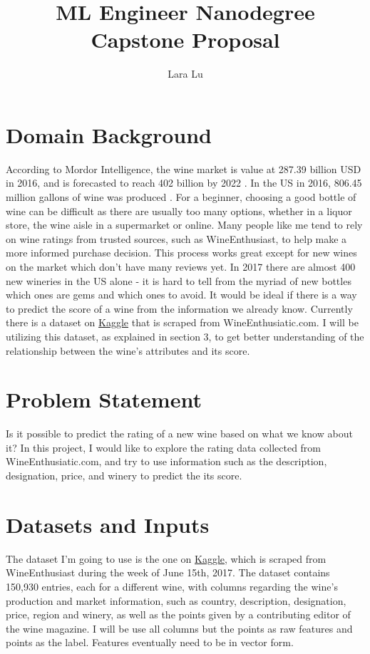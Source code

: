 \documentclass{article}
\begin{document}
\title{ML Engineer Nanodegree Capstone Proposal}
\author{Lara Lu}
\maketitle
\section{Domain Background}
According to Mordor Intelligence, the wine market is value at 287.39 billion USD in 2016, and is forecasted to reach 402 billion by 2022 \cite{mordorintelligence}. In the US in 2016, 806.45 million gallons of wine was produced \cite{statistica}.  For a beginner, choosing a good bottle of wine can be difficult as there are usually too many options, whether in a liquor store, the wine aisle in a supermarket or online. Many people like me tend to rely on wine ratings from trusted sources, such as WineEnthusiast, to help make a more informed purchase decision. This process works great except for new wines on the market which don't have many reviews yet. In 2017 there are almost 400 new wineries in the US alone\cite{winebusiness} - it is hard to tell from the myriad of new bottles which ones are gems and which ones to avoid. It would be ideal if there is a way to predict the score of a wine from the information we already know. Currently there is a dataset on \href{https://www.kaggle.com/zynicide/wine-reviews/}{Kaggle} that is scraped from WineEnthusiatic.com. I will be utilizing this dataset, as explained in section 3, to get better understanding of the relationship between the wine's attributes and its score.

\section{Problem Statement}
Is it possible to predict the rating of a new wine based on what we know about it? In this project, I would like to explore the rating data collected from WineEnthusiatic.com, and try to use information such as the description, designation, price, and winery to predict the its score.

\section{Datasets and Inputs}
The dataset I'm going to use is the one on \href{https://www.kaggle.com/zynicide/wine-reviews/data}{Kaggle}, which is scraped from WineEnthusiast during the week of June 15th, 2017. The dataset contains 150,930 entries, each for a different wine, with columns regarding the wine's production and market information, such as country, description, designation, price, region and winery, as well as the points given by a contributing editor of the wine magazine. I will be use all columns but the points as raw features and points as the label. Features eventually need to be in vector form.
\end{document}
